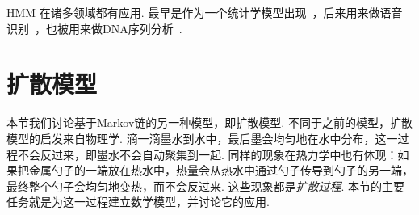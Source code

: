\begin{remark}
    HMM 在诸多领域都有应用. 最早是作为一个统计学模型出现~\cite{baumStatisticalInferenceProbabilistic1966}，后来用来做语音识别~\cite{jelinekDesignLinguisticStatistical1975,huangHiddenMarkovModels1990}，也被用来做DNA序列分析~\cite{bishopMaximumLikelihoodAlignment1986}. 
\end{remark}

\section{扩散模型}

本节我们讨论基于Markov链的另一种模型，即扩散模型. 不同于之前的模型，扩散模型的启发来自物理学. 滴一滴墨水到水中，最后墨会均匀地在水中分布，这一过程不会反过来，即墨水不会自动聚集到一起. 同样的现象在热力学中也有体现：如果把金属勺子的一端放在热水中，热量会从热水中通过勺子传导到勺子的另一端，最终整个勺子会均匀地变热，而不会反过来. 这些现象都是\textit{扩散过程}. 本节的主要任务就是为这一过程建立数学模型，并讨论它的应用. 

